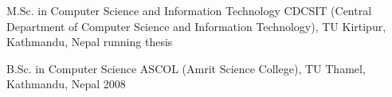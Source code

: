 

\begin{cventries}

  \cventry
    {M.Sc. in Computer Science and Information Technology} %
    {CDCSIT (Central Department of Computer Science and Information Technology), TU} %
    {Kirtipur, Kathmandu, Nepal} %
    {running thesis} %
    {}  
    
    \cventry
    {B.Sc. in Computer Science} %
    {ASCOL (Amrit Science College), TU} %
    {Thamel, Kathmandu, Nepal} %
    {2008} %
    {}
\end{cventries}

